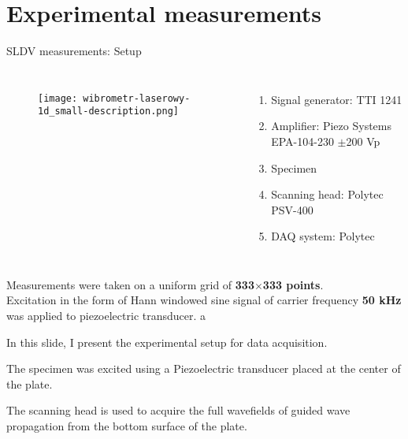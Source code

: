 \documentclass[10pt,aspectratio=169,dvipsnames]{beamer} %
\begin{document}
	\section*{Experimental measurements}
	\begin{frame}[t]{SLDV measurements: Setup}
		\begin{columns}[T]
			\begin{figure}
				\texttt{[image: wibrometr-laserowy-1d\_small-description.png]}
			\end{figure}
			\begin{enumerate}
				\item Signal generator: TTI 1241 
				\item Amplifier: Piezo Systems EPA-104-230 $\pm$200 Vp
				\item Specimen
				\item Scanning head: Polytec PSV-400
				\item DAQ system: Polytec
			\end{enumerate}
		\end{columns}
		{\small
			Measurements were taken on a uniform grid of \textbf{333$\times$333 points}.\\
			Excitation in the form of Hann windowed sine signal of carrier frequency \textbf{50 kHz} was applied to piezoelectric transducer.}
		a	\end{frame}
	\note
	{
		In this slide, I present the experimental setup for data acquisition.
		
		The specimen was excited using a Piezoelectric transducer placed at the center of the plate.
		
		The scanning head is used to acquire the full wavefields of guided wave propagation from the bottom surface of the plate.	
	}
\end{document}
